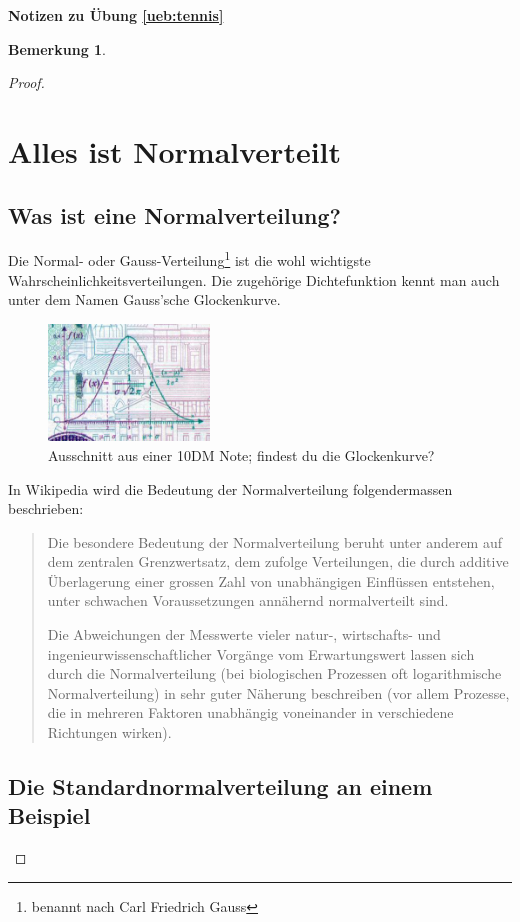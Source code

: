 \documentclass[%
<<<<<<< Updated upstream
11pt,%
twoside,%
titlepage,%
german,%
=======
11pt,%
twoside,%
titlepage,%
swissgerman,%
>>>>>>> Stashed changes
headsepline%
]{scrartcl}
\newcommand{\faReturnGray}{\textcolor{gray}{\faMailReply}} %
\newcommand{\definition}[1]{\colorbox{emerald}{#1}}
\theoremstyle{definition}
\newtheorem{bem}{Bemerkung}[subsection] %
\theoremstyle{plain}
\newcommand{\concatueb}[1]{ueb:#1}%
\newcommand{\concatlsg}[1]{lsg:#1}%
\newenvironment{lsg}[1]{%
    \par\noindent\textbf{Notizen zu Übung \ref{\concatueb{#1}}}\label{\concatlsg{#1}}
    \hfill\hyperref[\concatueb{#1}]{\faReturnGray}\par %
}{%
    \par%
}
\newcounter{theo}[section]\setcounter{theo}{0}
\newcommand{\concatueb}[1]{ueb:#1}%
\newcommand{\concatlsg}[1]{lsg:#1}%
\newenvironment{lsg}[1]{%
    \par\noindent\textbf{Notizen zu Übung \ref{\concatueb{#1}}.}%
    \label{\concatlsg{#1}}
}{%
    \par%
}
\newcommand{\definition}[1]{\colorbox{emerald}{#1}}
\begin{document}
\begin{lsg}{tennis}
\begin{bem}
\begin{proof}
\clearpage

\section{Alles ist Normalverteilt}

\subsection{Was ist eine Normalverteilung?}

Die Normal- oder Gauss-Verteilung\footnote{benannt nach Carl Friedrich Gauss} ist die wohl wichtigste Wahrscheinlichkeitsverteilungen. Die zugehörige Dichtefunktion kennt man auch unter dem Namen \definition{Gauss'sche Glockenkurve}.

\begin{figure}
    \centering
    \includegraphics[width=0.382\textwidth]{pictures/gauss}
    \caption{Ausschnitt aus einer 10DM Note; findest du die Glockenkurve?}
    \label{fig:glockenkurve}
\end{figure}

In Wikipedia wird die Bedeutung der Normalverteilung folgendermassen beschrieben:
\begin{quote}
 Die besondere Bedeutung der Normalverteilung beruht unter anderem auf dem zentralen Grenzwertsatz, dem zufolge Verteilungen, die durch additive Überlagerung einer grossen Zahl von unabhängigen Einflüssen entstehen, unter schwachen Voraussetzungen annähernd normalverteilt sind.
 
 Die Abweichungen der Messwerte vieler natur-, wirtschafts- und ingenieurwissenschaftlicher Vorgänge vom Erwartungswert lassen sich durch die Normalverteilung (bei biologischen Prozessen oft logarithmische Normalverteilung) in sehr guter Näherung beschreiben (vor allem Prozesse, die in mehreren Faktoren unabhängig voneinander in verschiedene Richtungen wirken).
\end{quote}

\subsection{Die Standardnormalverteilung an einem Beispiel}


\end{proof}
\end{bem}
\end{lsg}
\end{document}
